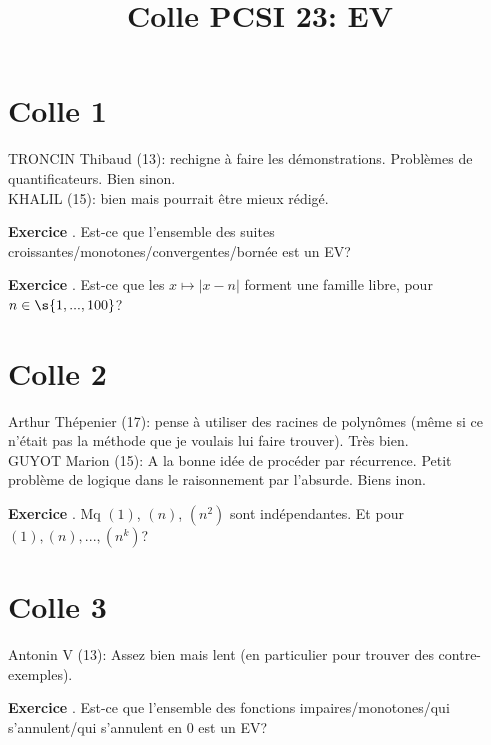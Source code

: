 \documentclass[10pt,a4paper]{article}
\title{Colle PCSI 23: EV}
\newcounter{question}
\newcounter{exo}
\newenvironment{exo}{\vspace{0.5cm}\setcounter{question}{0}\addtocounter{exo}{1} \noindent \textbf{Exercice \theexo}. \normalsize }{\par}
\begin{document}
	\maketitle
	
	\section*{Colle 1}
	\setcounter{exo}{0}
	TRONCIN Thibaud (13): rechigne à faire les démonstrations. Problèmes de quantificateurs. Bien sinon.\\
	KHALIL (15): bien mais pourrait être mieux rédigé.
	
	\begin{exo}
		Est-ce que l'ensemble des suites croissantes/monotones/convergentes/bornée est un EV?
	\end{exo}	
	
	\begin{exo}
		Est-ce que les $x \longmapsto \vert x - n \vert$ forment une famille libre, pour $n \in \s{1, ..., 100}$?
	\end{exo}	
	
	\section*{Colle 2}
	\setcounter{exo}{0}
	Arthur Thépenier (17): pense à utiliser des racines de polynômes (même si ce n'était pas la méthode que je voulais lui faire trouver). Très bien.\\
	GUYOT Marion (15): A la bonne idée de procéder par récurrence. Petit problème de logique dans le raisonnement par l'absurde. Biens inon. \\
	
	\begin{exo}
		Mq $(1)$, $(n)$, $(n^2)$ sont indépendantes. Et pour $(1), (n), ..., (n^k)$?
	\end{exo}

	\section*{Colle 3}
	\setcounter{exo}{0}
	Antonin V (13): Assez bien mais lent (en particulier pour trouver des contre-exemples).\\
	
	\begin{exo}
		Est-ce que l'ensemble des fonctions impaires/monotones/qui s'annulent/qui s'annulent en 0 est un EV?
	\end{exo}	
\end{document}
